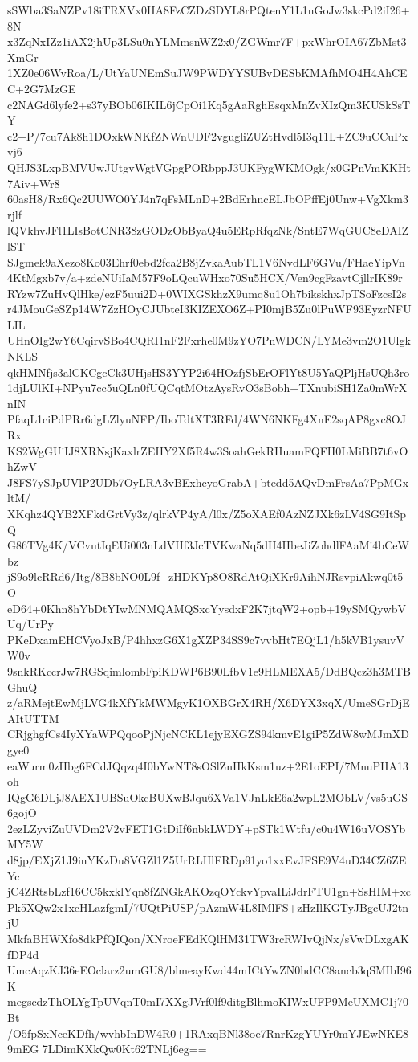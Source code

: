 sSWba3SaNZPv18iTRXVx0HA8FzCZDzSDYL8rPQtenY1L1nGoJw3skcPd2iI26+8N
x3ZqNxIZz1iAX2jhUp3LSu0nYLMmsnWZ2x0/ZGWmr7F+pxWhrOIA67ZbMst3XmGr
1XZ0e06WvRoa/L/UtYaUNEmSuJW9PWDYYSUBvDESbKMAfhMO4H4AhCEC+2G7MzGE
c2NAGd6lyfe2+s37yBOb06IKIL6jCpOi1Kq5gAaRghEsqxMnZvXIzQm3KUSkSsTY
c2+P/7cu7Ak8h1DOxkWNKfZNWnUDF2vgugliZUZtHvdl5I3q11L+ZC9uCCuPxvj6
QHJS3LxpBMVUwJUtgvWgtVGpgPORbppJ3UKFygWKMOgk/x0GPnVmKKHt7Aiv+Wr8
60asH8/Rx6Qc2UUWO0YJ4n7qFsMLnD+2BdErhncELJbOPffEj0Unw+VgXkm3rjlf
lQVkhvJFl1LIsBotCNR38zGODzObByaQ4u5ERpRfqzNk/SntE7WqGUC8eDAIZlST
SJgmek9aXezo8Ko03Ehrf0ebd2fca2B8jZvkaAubTL1V6NvdLF6GVu/FHaeYipVn
4KtMgxb7v/a+zdeNUiIaM57F9oLQcuWHxo70Su5HCX/Ven9cgFzavtCjllrIK89r
RYzw7ZuHvQlHke/ezF5uui2D+0WIXGSkhzX9umq8u1Oh7bikskhxJpTSoFzcsI2s
r4JMouGeSZp14W7ZzHOyCJUbteI3KIZEXO6Z+PI0mjB5Zu0lPuWF93EyzrNFULIL
UHnOIg2wY6CqirvSBo4CQRI1nF2Fxrhe0M9zYO7PnWDCN/LYMe3vm2O1UlgkNKLS
qkHMNfjs3alCKCgcCk3UHjsHS3YYP2i64HOzfjSbErOFlYt8U5YaQPljHsUQh3ro
1djLUlKI+NPyu7cc5uQLn0fUQCqtMOtzAysRvO3sBobh+TXnubiSH1Za0mWrXnIN
PfaqL1ciPdPRr6dgLZlyuNFP/IboTdtXT3RFd/4WN6NKFg4XnE2sqAP8gxc8OJRx
KS2WgGUiIJ8XRNsjKaxlrZEHY2Xf5R4w3SoahGekRHuamFQFH0LMiBB7t6vOhZwV
J8FS7ySJpUVlP2UDb7OyLRA3vBExhcyoGrabA+btedd5AQvDmFrsAa7PpMGxltM/
XKqhz4QYB2XFkdGrtVy3z/qlrkVP4yA/l0x/Z5oXAEf0AzNZJXk6zLV4SG9ItSpQ
G86TVg4K/VCvutIqEUi003nLdVHf3JcTVKwaNq5dH4HbeJiZohdlFAaMi4bCeWbz
jS9o9lcRRd6/Itg/8B8bNO0L9f+zHDKYp8O8RdAtQiXKr9AihNJRsvpiAkwq0t5O
eD64+0Khn8hYbDtYIwMNMQAMQSxcYysdxF2K7jtqW2+opb+19ySMQywbVUq/UrPy
PKeDxamEHCVyoJxB/P4hhxzG6X1gXZP34SS9c7vvbHt7EQjL1/h5kVB1ysuvVW0v
9snkRKccrJw7RGSqimlombFpiKDWP6B90LfbV1e9HLMEXA5/DdBQcz3h3MTBGhuQ
z/aRMejtEwMjLVG4kXfYkMWMgyK1OXBGrX4RH/X6DYX3xqX/UmeSGrDjEAItUTTM
CRjghgfCs4IyXYaWPQqooPjNjcNCKL1ejyEXGZS94kmvE1giP5ZdW8wMJmXDgye0
eaWurm0zHbg6FCdJQqzq4I0bYwNT8sOSlZnIIkKsm1uz+2E1oEPI/7MnuPHA13oh
IQgG6DLjJ8AEX1UBSuOkcBUXwBJqu6XVa1VJnLkE6a2wpL2MObLV/vs5uGS6gojO
2ezLZyviZuUVDm2V2vFET1GtDiIf6nbkLWDY+pSTk1Wtfu/c0u4W16uVOSYbMY5W
d8jp/EXjZ1J9inYKzDu8VGZl1Z5UrRLHlFRDp91yo1xxEvJFSE9V4uD34CZ6ZEYc
jC4ZRtsbLzf16CC5kxklYqn8fZNGkAKOzqOYckvYpvaILiJdrFTU1gn+SsHIM+xc
Pk5XQw2x1xcHLazfgmI/7UQtPiUSP/pAzmW4L8IMlFS+zHzIlKGTyJBgcUJ2tnjU
MkfaBHWXfo8dkPfQIQon/XNroeFEdKQlHM31TW3rcRWIvQjNx/sVwDLxgAKfDP4d
UmcAqzKJ36eEOclarz2umGU8/blmeayKwd44mICtYwZN0hdCC8ancb3qSMIbI96K
megscdzThOLYgTpUVqnT0mI7XXgJVrf0lf9ditgBlhmoKIWxUFP9MeUXMC1j70Bt
/O5fpSxNceKDfh/wvhbInDW4R0+1RAxqBNl38oe7RnrKzgYUYr0mYJEwNKE89mEG
7LDimKXkQw0Kt62TNLj6eg==
